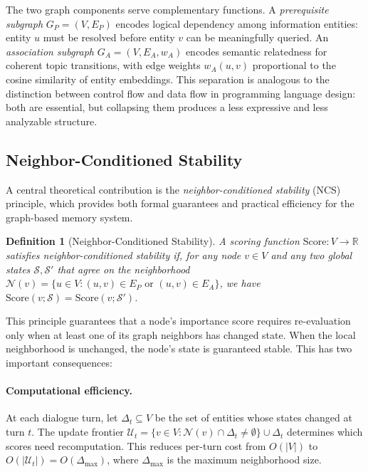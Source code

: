 \documentclass[10pt,twocolumn]{article}
\newtheorem{definition}{Definition}
\begin{document}
The two graph components serve complementary functions. A \emph{prerequisite
subgraph} $G_P = (V, E_P)$ encodes logical dependency among information
entities: entity $u$ must be resolved before entity $v$ can be meaningfully
queried. An \emph{association subgraph} $G_A = (V, E_A, w_A)$ encodes
semantic relatedness for coherent topic transitions, with edge weights
$w_A(u,v)$ proportional to the cosine similarity of entity embeddings.
This separation is analogous to the distinction between control flow and
data flow in programming language design: both are essential, but collapsing
them produces a less expressive and less analyzable structure.

\subsection{Neighbor-Conditioned Stability}
\label{sec:ncs}

A central theoretical contribution is the \emph{neighbor-conditioned
stability} (NCS) principle, which provides both formal guarantees and
practical efficiency for the graph-based memory system.

\begin{definition}[Neighbor-Conditioned Stability]
\label{def:ncs}
A scoring function $\mathrm{Score}: V \to \mathbb{R}$ satisfies
neighbor-conditioned stability if, for any node $v \in V$ and any two
global states $\mathcal{S}, \mathcal{S}'$ that agree on the neighborhood
$\mathcal{N}(v) = \{u \in V : (u,v) \in E_P \text{ or } (u,v) \in E_A\}$,
we have $\mathrm{Score}(v; \mathcal{S}) = \mathrm{Score}(v; \mathcal{S}')$.
\end{definition}

This principle guarantees that a node's importance score requires
re-evaluation only when at least one of its graph neighbors has changed
state. When the local neighborhood is unchanged, the node's state is
guaranteed stable. This has two important consequences:

\paragraph{Computational efficiency.}
At each dialogue turn, let $\Delta_t \subseteq V$ be the set of entities
whose states changed at turn $t$. The update frontier
$\mathcal{U}_t = \{v \in V : \mathcal{N}(v) \cap \Delta_t \neq
\emptyset\} \cup \Delta_t$ determines which scores need recomputation.
This reduces per-turn cost from $O(|V|)$ to
$O(|\mathcal{U}_t|) = O(\Delta_{\max})$, where $\Delta_{\max}$ is the
maximum neighborhood size.
\end{document}
